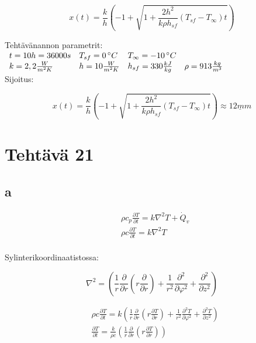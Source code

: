 \documentclass[12pt,a4paper,finnish]{article}
\begin{document}
\begin{framed}
 \begin{equation}
  x(t) = \frac{k}{h}\left( -1 + \sqrt{ 1 + \frac{2h^2}{k\rho h_{sf}}(T_{sf} - T_{\infty})t}\right)
 \end{equation}
\end{framed}


Tehtävänannon parametrit:\\

\begin{math}
 \begin{array}{l l l l}
  t = 10 h = 36000 s & T_{sf} = 0\,^{\circ}C & T_{\infty} = -10\,^{\circ}C &\\
  k = 2,2 \frac{W}{m^2K} & h = 10 \frac{W}{m^2K} & h_{sf} = 330 \frac{kJ}{kg} & \rho = 913 \frac{kg}{m^3}
 \end{array}
\end{math}\\

Sijoitus:

\begin{equation}
 x(t) = \frac{k}{h}\left( -1 + \sqrt{ 1 + \frac{2h^2}{k\rho h_{sf}}(T_{sf} - T_{\infty})t}\right) \approx \underline{12 mm}
\end{equation}

\section{Tehtävä 21}

\subsection{a}

\begin{align}
 &\rho c_p \frac{\partial T}{\partial t} = k\nabla^2T + \dot{Q}_v\\
 &\rho c \frac{\partial T}{\partial t} = k\nabla^2T\\
\end{align}

Sylinterikoordinaatistossa:

\begin{equation}
 \nabla^2 = \left(\frac{1}{r}\frac{\partial}{\partial r}\left(r\frac{\partial}{\partial r}\right)
   + \frac{1}{r^2}\frac{\partial^2}{\partial \varphi^2} + \frac{\partial^2}{\partial z^2}\right)
\end{equation}

\begin{align}
 &\rho c \frac{\partial T}{\partial t} = k\left(\frac{1}{r}\frac{\partial}{\partial r}
 \left(r\frac{\partial T}{\partial r}\right) 
  + \frac{1}{r^2}\frac{\partial^2 T}{\partial \varphi^2} + \frac{\partial^2 T}{\partial z^2}\right)\\
 &\frac{\partial T}{\partial t} = \frac{k}{\rho c}\left(\frac{1}{r}\frac{\partial}{\partial r}
 \left(r\frac{\partial T}{\partial r}\right)\right)
\end{align}
\end{document}
